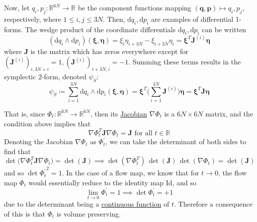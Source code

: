       Now, let $q_i, p_j: \mathbb{R}^{6N} \to \mathbb{R}$ be the component functions mapping $(\mathbf{q}, \mathbf{p}) \mapsto q_i, p_j$, respectively, where $1 \leq i, j \leq 3N$. Then, $\mathrm{d} q_i, \mathrm{d} p_i$ are examples of differential 1-forms. The wedge product of the coordinate differentials $\mathrm{d}q_i, \mathrm{d} p_i$ can be written
      \begin{equation}
        (\mathrm{d}q_i \wedge \mathrm{d} p_i)(\boldsymbol{\xi}, \boldsymbol{\eta}) = \xi_i\eta_{i + 3N} - \xi_{i + 3N} \eta_i = \boldsymbol{\xi}^T \mathbf{J}^{(i)} \boldsymbol{\eta}
      \end{equation}
      where $\mathbf{J}$ is the matrix which has zeros everywhere except for $(\mathbf{J}^{(i)})_{i, 3N + i} = 1, (\mathbf{J}^{(i)})_{i + 3N, i} = -1$. Summing these terms results in the symplectic 2-form, denoted $\psi_S$: 
      \begin{equation}
        \psi_S \coloneqq \sum_{i=1}^{3N} \mathrm{d}q_i \wedge \mathrm{d} p_i (\boldsymbol{\xi}, \boldsymbol{\eta}) = \boldsymbol{\xi}^T \bigg( \sum_{i=1}^{3N} \mathbf{J}^{(i)} \bigg) \boldsymbol{\eta} = \boldsymbol{\xi}^T \mathbf{J} \boldsymbol{\eta}
      \end{equation}

      That is, since $\Phi_t: \mathbb{R}^{6N} \to \mathbb{R}^{6N}$, then its \hyperref[mv-def:jacobian]{Jacobian} $\nabla \Phi_t$ is a $6N \times 6N$ matrix, and the condition above implies that 
      \begin{equation}
        \nabla \Phi_t^T \mathbf{J} \nabla \Phi_t = \mathbf{J} \text{ for all } t \in \mathbb{R}
      \end{equation}
      Denoting the Jacobian $\nabla \Phi_t$ as $\Phi_t^\prime$, we can take the determinant of both sides to find that 
      \begin{equation}
        \det\big(\nabla \Phi_t^T \mathbf{J} \nabla \Phi_t\big) = \det(\mathbf{J}) \implies \det(\nabla \Phi_t^T) \, \det(\mathbf{J})\, \det(\nabla \Phi_t) = \det(\mathbf{J})
      \end{equation}
      and so $\det{\Phi_t^\prime}^2 = 1$. In the case of a flow map, we know that for $t \rightarrow 0$, the flow map $\Phi_{t}$ would essentially reduce to the identity map $\mathrm{Id}$, and so
      \begin{equation}
        \lim_{t \rightarrow 0} \Phi_t^\prime = 1 \implies \det{\Phi_t^\prime} = + 1
      \end{equation}
      due to the determinant being a \hyperref[pst-def:continuous_func]{continuous function} of $t$. Therefore a consequence of this is that $\Phi_t$ is volume preserving. 

